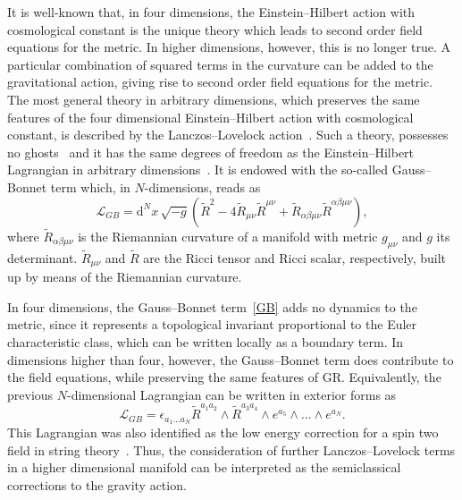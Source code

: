 \documentclass[aps,prd,12pt,superscriptaddress,showpacs,showkeys,longbibliography,reprint,nofootinbib]{revtex4-1}
\begin{document}
It is well-known that, in four dimensions, the Einstein--Hilbert action with cosmological constant is the unique theory which leads to second order field equations for the metric. In higher dimensions, however, this is no longer true. A particular combination of squared terms in the curvature can be added to the gravitational action, giving rise to second order field equations for the metric. The most general theory in arbitrary dimensions, which preserves the same features of the four dimensional Einstein--Hilbert action with cosmological constant, is described by the Lanczos--Lovelock action~\cite{Lanczos:1938sf,Lovelock:1971yv}. Such a theory, possesses no ghosts~\cite{Zumino:1985dp} and it has the same degrees of freedom as the Einstein--Hilbert Lagrangian in arbitrary dimensions~\cite{Henneaux:1990au}. It is endowed with the so-called Gauss--Bonnet term which, in $N$-dimensions, reads as
\begin{equation}\label{GB}
  \mathcal{L}_{GB}=\text{d}^N \!x \,\sqrt{-g}\left(\tilde{R}^2-4\tilde{R}_{\mu\nu}\tilde{R}^{\mu\nu}+\tilde{R}_{\alpha\beta\mu\nu}
  \tilde{R}^{\alpha\beta\mu\nu}\right),
\end{equation}
where $\tilde{R}_{\alpha\beta\mu\nu}$ is the Riemannian curvature of a manifold with metric $g_{\mu\nu}$ and $g$ its determinant. $\tilde{R}_{\mu\nu}$ and $\tilde{R}$ are the Ricci tensor and Ricci scalar, respectively, built up by means of the Riemannian curvature.

In four dimensions, the Gauss--Bonnet term~\eqref{GB} adds no dynamics to the metric, since it represents a topological invariant proportional to the Euler characteristic class, which can be written locally as a boundary term. In dimensions higher than four, however, the Gauss--Bonnet term does contribute to the field equations, while preserving the same features of GR. Equivalently, the previous $N$-dimensional Lagrangian can be written in exterior forms as
\begin{equation}\label{GB2}
\mathcal{L}_{GB} = \epsilon_{a_1...a_N} \tilde{R}^{a_1a_2}\wedge\tilde{R}^{a_3a_4}\wedge e^{a_5}\wedge...\wedge e^{a_N}.
\end{equation}
This Lagrangian was also identified as the low energy correction for a spin two field in string theory~\cite{Zwiebach:1985uq}. Thus, the consideration of further Lanczos--Lovelock terms in a higher dimensional manifold can be interpreted as the semiclassical corrections to the gravity action.
\end{document}
